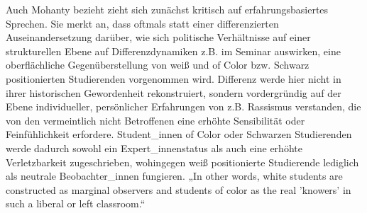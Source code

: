 Auch Mohanty bezieht zieht sich zunächst kritisch auf erfahrungsbasiertes
Sprechen. Sie merkt an, dass oftmals statt einer differenzierten
Auseinandersetzung darüber, wie sich politische Verhältnisse auf einer
strukturellen Ebene auf Differenzdynamiken z.B. im Seminar auswirken, eine
oberflächliche Gegenüberstellung von weiß und of Color bzw. Schwarz
positionierten Studierenden vorgenommen wird. Differenz werde hier nicht in
ihrer historischen Gewordenheit rekonstruiert, sondern vordergründig auf der
Ebene individueller, persönlicher Erfahrungen von z.B. Rassismus verstanden,
die von den vermeintlich nicht Betroffenen eine erhöhte Sensibilität oder
Feinfühlichkeit erfordere. Student\_innen of Color oder Schwarzen Studierenden
werde dadurch sowohl ein Expert\_innenstatus als auch eine erhöhte
Verletzbarkeit zugeschrieben, wohingegen weiß positionierte Studierende
lediglich als neutrale Beobachter\_innen fungieren. „In other words, white
students are constructed as marginal observers and students of color as the
real 'knowers' in such a liberal or left
classroom.“\footnotemark{}\\

